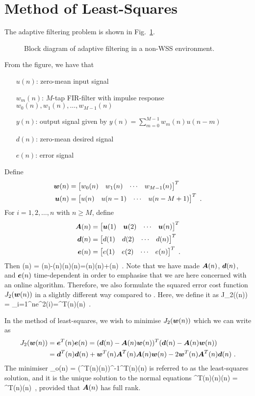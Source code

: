 \section{Method of Least-Squares}
The adaptive filtering problem is shown in Fig.~\ref{fig:nonwss_block_diagram2}.
\begin{figure}[htbp]
  \centering
  \caption{Block diagram of adaptive filtering in a non-WSS environment.}
  \label{fig:nonwss_block_diagram2}
\end{figure}
From the figure, we have that
\begin{itemize}
  \item[$u(n)$:] zero-mean input signal
  \item[$w_m(n)$:] $M$-tap FIR-filter with impulse response $w_0(n),w_1(n),\ldots,w_{M-1}(n)$
  \item[$y(n)$:] output signal given by $y(n) = \sum_{m=0}^{M-1}w_m(n) u(n-m)$
  \item[$d(n)$:] zero-mean desired signal
  \item[$e(n)$:] error signal
\end{itemize}
Define
\begin{align}
  \boldsymbol{w}(n) &= \begin{bmatrix} w_0(n) & w_{1}(n) & \cdots & w_{M-1}(n)\end{bmatrix}^T\\
  \boldsymbol{u}(n)&= \begin{bmatrix} u(n) & u(n-1) & \cdots & u(n-M+1)\end{bmatrix}^T\ .
\end{align}
For $i=1,2,\ldots,n$ with $n\geq M$, define
\begin{align}
  \boldsymbol{A}(n) &= \begin{bmatrix} \boldsymbol{u}(1) & \boldsymbol{u}(2) & \cdots & \boldsymbol{u}(n)\end{bmatrix}^T\\
  \boldsymbol{d}(n) &= \begin{bmatrix} d(1) & d(2) & \cdots & d(n)\end{bmatrix}^T\\
  \boldsymbol{e}(n) &= \begin{bmatrix} e(1) & e(2) & \cdots & e(n)\end{bmatrix}^T\ .
\end{align}
Then
\bmath
  (n) = (n)-(n)(n)\quad\iff\quad{}(n)=(n)(n)+(n)\ .
\emath
Note that we have made $\boldsymbol{A}(n)$, $\boldsymbol{d}(n)$, and $\boldsymbol{e}(n)$ time-dependent in order to emphasise that we are here concerned with an online algorithm. Therefore, we also formulate the squared error cost function $J_2(\boldsymbol{w}(n))$ in a slightly different way compared to . Here, we define it as
\bmath
  J_2((n)) = \sum_{i=1}^{n}e^2(i)=^T(n)(n)\ .
\emath

In the method of least-squares, we wish to minimise $J_2(\boldsymbol{w}(n))$ which we can write as
\begin{align}
  J_2(\vect{w}(n)) &= \vect{e}^T(n)\vect{e}(n) = (\vect{d}(n)-\vect{A}(n)\vect{w}(n))^T(\vect{d}(n)-\vect{A}(n)\vect{w}(n))\notag\\
  &= \vect{d}^T(n)\vect{d}(n)+\vect{w}^T(n)\vect{A}^T(n)\vect{A}(n)\vect{w}(n)-2\vect{w}^T(n)\vect{A}^T(n)\vect{d}(n)\ .
\end{align}
The minimiser
\bmath
  _o(n) = (^T(n)(n))^{-1}^T(n)(n)
\emath
is referred to as the least-squares solution, and it is the unique solution to the normal equations
\bmath
  ^T(n)(n)(n) = ^T(n)(n)\ ,
\emath
provided that $\boldsymbol{A}(n)$ has full rank.

